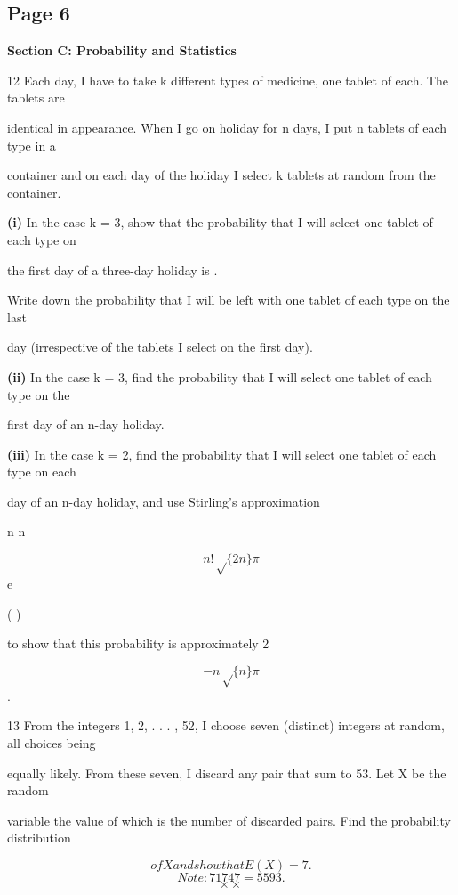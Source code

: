 \documentclass[12pt]{article}
\begin{document}
\subsection*{Page 6}
\begin{flushleft}
\bigskip\textbf{Section C: Probability and Statistics}\par
12 Each day, I have to take k different types of medicine, one tablet of each. The tablets are\par
identical in appearance. When I go on holiday for n days, I put n tablets of each type in a\par
container and on each day of the holiday I select k tablets at random from the container.\par
\textbf{(i)} In the case k = 3, show that the probability that I will select one tablet of each type on\par
the first day of a three-day holiday is .\par
Write down the probability that I will be left with one tablet of each type on the last\par
day (irrespective of the tablets I select on the first day).\par
\textbf{(ii)} In the case k = 3, find the probability that I will select one tablet of each type on the\par
first day of an n-day holiday.\par
\textbf{(iii)} In the case k = 2, find the probability that I will select one tablet of each type on each\par
day of an n-day holiday, and use Stirling's approximation\par
n n\par
\[n! \sqrt\{2n\}\pi\]
\approx e\par
( )\par
to show that this probability is approximately 2\par
\[-n\sqrt\{n\}\pi\]
.\par
13 From the integers 1, 2, . . . , 52, I choose seven (distinct) integers at random, all choices being\par
equally likely. From these seven, I discard any pair that sum to 53. Let X be the random\par
variable the value of which is the number of discarded pairs. Find the probability distribution\par
\[of X and show that E(X) = 7 .\]
\[Note: 7 17 47 = 5593.\]
\[\times \times\]
\end{flushleft}
\end{document}
